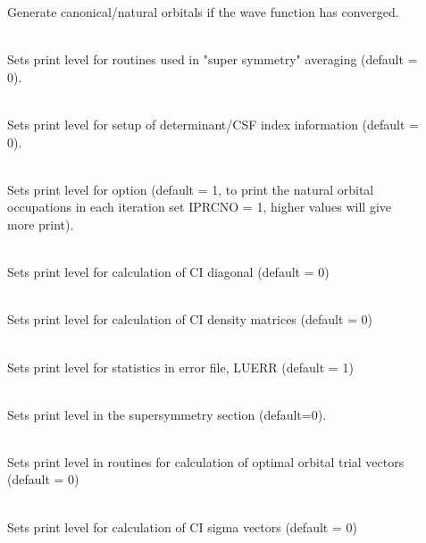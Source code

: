 \begin{description}
\item[]
  Generate canonical/natural orbitals if the wave function has
  converged.

\item[]
   \\
  Sets print level for routines used in "super symmetry" averaging
  (default = 0).
 
\item[]
   \\
  Sets print level for setup of determinant/CSF index information (default = 0).
 
\item[]
   \\
  Sets print level for  option (default = 1,
  to print the natural orbital occupations in each iteration set
  IPRCNO = 1, higher values will give more print).
 
\item[]
   \\
  Sets print level for calculation of CI diagonal (default = 0)
 
\item[]
   \\
  Sets print level for calculation of CI density matrices (default = 0)

\item[]
   \\
  Sets print level for statistics in error file, LUERR (default = 1)

\item[]
   \\ 
  Sets print level in the supersymmetry section (default=0).

\item[]
   \\
  Sets print level in routines for calculation of optimal orbital trial
  vectors (default = 0)
 
\item[]
   \\
  Sets print level for calculation of CI sigma vectors (default = 0)
 

\end{description}
